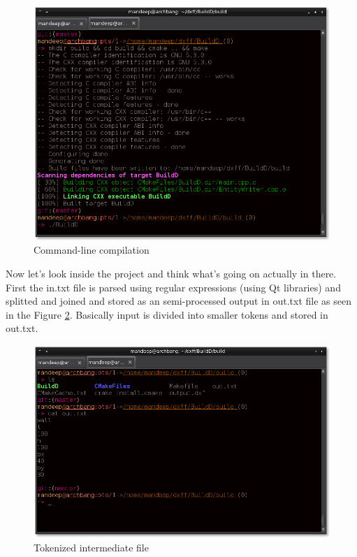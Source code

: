 \begin{figure}
	\centering
	\includegraphics[scale=0.49]{images/bld3.png}
	\caption{Command-line compilation}
	\label{fig:compile}
\end{figure}

Now let's look inside the project and think what's going on actually in there. First the in.txt file is parsed using regular expressions (using Qt libraries) and splitted and joined and stored as an semi-processed output in out.txt file as seen in the Figure \ref{fig:token}. Basically input is divided into smaller tokens and stored in out.txt.

\begin{figure}
\centering
\includegraphics[scale=0.5]{images/bld1.png}
\caption{Tokenized intermediate file}
\label{fig:token}
\end{figure}

